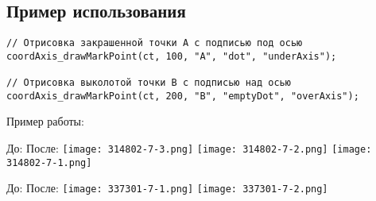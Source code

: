 \subsection{Пример использования}
\begin{verbatim}
// Отрисовка закрашенной точки A с подписью под осью
coordAxis_drawMarkPoint(ct, 100, "A", "dot", "underAxis");

// Отрисовка выколотой точки B с подписью над осью
coordAxis_drawMarkPoint(ct, 200, "B", "emptyDot", "overAxis");
\end{verbatim}

Пример работы:
 
До:
После:
\texttt{[image: 314802-7-3.png]}
\texttt{[image: 314802-7-2.png]}
\texttt{[image: 314802-7-1.png]}

 
До:
После:
\texttt{[image: 337301-7-1.png]}
\texttt{[image: 337301-7-2.png]}